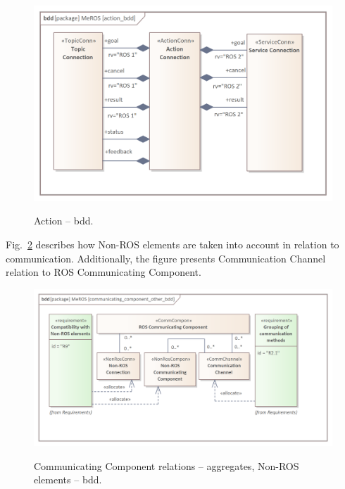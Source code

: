 \begin{figure}[hbt]
    \centering
    \begin{center}
    {\includegraphics[scale=1.1]{../imgs/meros_pkg/action_bdd.png}}
    \end{center}
    \caption{Action -- bdd.}
    \label{fig:action_bdd}
\end{figure}

\pagebreak

Fig.~\ref{fig:communicating_component_other_bdd} describes how Non-ROS elements are taken into account in relation to communication. Additionally, the figure presents Communication Channel relation to ROS Communicating Component.


\begin{figure}[H]
    \centering
    \begin{center}
    {\includegraphics[scale=0.95]{../imgs/meros_pkg/communicating_component_other_bdd.png}}
    \end{center}
    \caption{Communicating Component relations -- aggregates, Non-ROS elements -- bdd.}
    \label{fig:communicating_component_other_bdd}
\end{figure}

